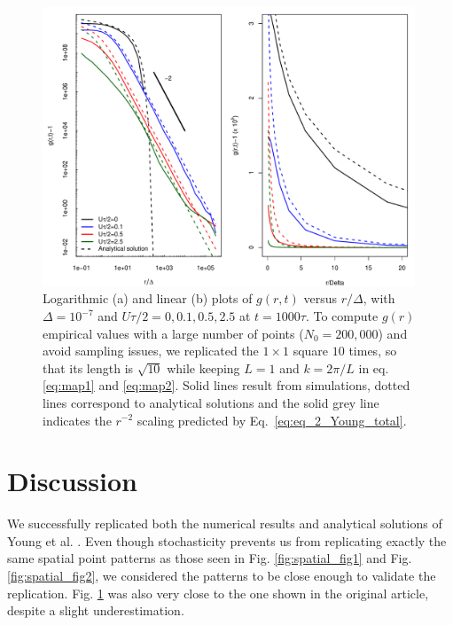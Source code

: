 \begin{figure}[H]
\begin{center}
 \includegraphics[width=0.99\textwidth]{../code/figure/pcf_test_Utot_modif_dx_dp.pdf}
 \caption{Logarithmic (a) and linear (b) plots of $g(r,t)$ versus $r/\Delta$, with $\Delta=10^{-7}$ and $U\tau/2=0,0.1,0.5,2.5$ at $t=1000\tau$. To compute $g(r)$ empirical values with a large number of points ($N_0=200,000$) and avoid sampling issues, we replicated the $1\times 1$ square $10$ times, so that its length is $\sqrt{10}$ while keeping $L=1$ and $k=2\pi/L$ in eq. \ref{eq:map1} and \ref{eq:map2}. Solid lines result from simulations, dotted lines correspond to analytical solutions and the solid grey line indicates the $r^{-2}$ scaling predicted by Eq.~\ref{eq:eq_2_Young_total}.}
  \label{fig:pcf_Fig3}
\end{center}
  \end{figure} 
 
\section*{Discussion}

We successfully replicated both the numerical results and analytical solutions of Young et al. \citep{young_reproductive_2001}. Even though stochasticity prevents us from replicating exactly the same spatial point patterns as those seen in Fig. \ref{fig:spatial_fig1} and Fig. \ref{fig:spatial_fig2}, we considered the patterns to be close enough to validate the replication. Fig. \ref{fig:pcf_Fig3} was also very close to the one shown in the original article, despite a slight underestimation.\\

